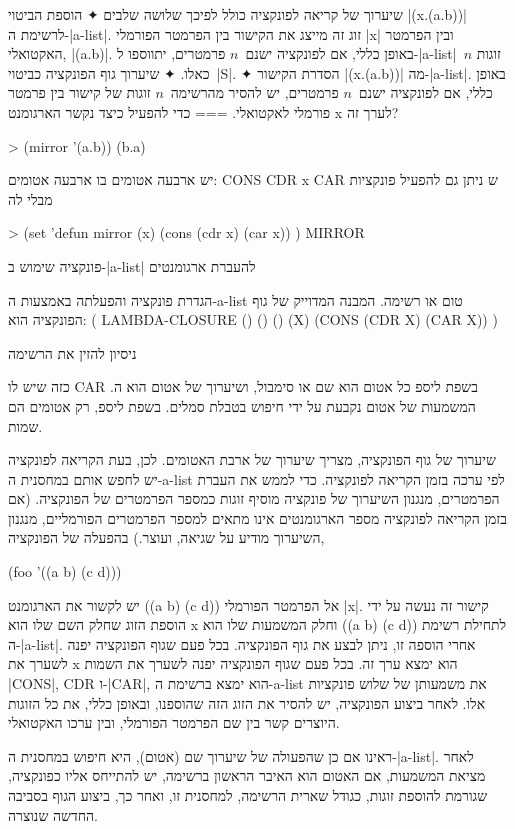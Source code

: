 \documentclass[a4paper,12pt,reqno]{article}
\begin{document}
שיערוך של קריאה לפונקציה כולל לפיכך שלושה שלבים
✦ הוספת הביטוי \E|(x.(a.b))| לרשימת ה-\E|a-list|. זוג זה מייצג את הקישור בין
הפרמטר הפורמלי \E|x| ובין הפרמטר האקטואלי, \E|(a.b)|. באופן כללי, אם לפונקציה
ישנם~$n$ פרמטרים, יתווספו ל-\E|a-list|~$n$ זוגות כאלו.
✦ שיערוך גוף הפונקציה כביטוי~\E|S|.
✦ הסדרת הקישור \E|(x.(a.b))| מה-\E|a-list|. באופן כללי, אם לפונקציה
ישנם~$n$ פרמטרים, יש להסיר מהרשימה~$n$ זוגות של קישור בין פרמטר פורמלי
לאקטואלי.
===
כדי
להפעיל
כיצד נקשר הארגומנט x
לערך זה?
\begin{LISP}
> (mirror '(a.b))
(b.a)
\end{LISP}

יש ארבעה אטומים בו ארבעה אטומים:
CONS
CDR
x
CAR
ש
ניתן גם להפעיל פונקציות מבלי לה
\begin{LISP}
> (set 'defun
  mirror (x)
  (cons (cdr x) (car x))
)
MIRROR
\end{LISP}
פונקציה
שימוש ב-\E|a-list| להעברת ארגומנטים

הגדרת פונקציה והפעלתה באמצעות ה-a-list
טום או רשימה. המבנה המדוייק של גוף הפונקציה הוא:
(
LAMBDA-CLOSURE () () ()
(X)
(CONS (CDR X) (CAR X))
)

ניסיון להזין את הרשימה

כזה שיש לו CּAR בשפת ליספ כל אטום הוא שם או סימבול,
ושיערוך של אטום
הוא ה.
המשמעות של אטום נקבעת על ידי חיפוש בטבלת סמלים. בשפת ליספ, רק אטומים הם שמות.

שיערוך של גוף הפונקציה, מצריך שיערוך של ארבת האטומים. לכן, בעת הקריאה לפונקציה
יש לחפש אותם במחסנית ה-a-list לפי ערכה בזמן הקריאה לפונקציה. כדי לממש את העברת
הפרמטרים, מנגנון השיערוך של פונקציה מוסיף זוגות כמספר הפרמטרים של הפונקציה. (אם
בזמן הקריאה לפונקציה מספר הארגומנטים אינו מתאים למספר הפרמטרים הפורמליים, מנגנון
השיערוך מודיע על שגיאה, ועוצר.) בהפעלה של הפונקציה,
\begin{LISP}
  (foo '((a b) (c d)))
\end{LISP}
יש לקשור את הארגומנט ((a b) (c d)) אל הפרמטר הפורמלי \E|x|. קישור זה נעשה על
ידי הוספת הזוג שחלק השם שלו הוא x וחלק המשמעות שלו הוא ((a b) (c d)) לתחילת
רשימת
ה-\E|a-list|. אחרי הוספה זו, ניתן לבצע את גוף הפונקציה. בכל פעם שגוף הפונקציה יפנה
לשערך את x הוא ימצא ערך זה. בכל פעם שגוף הפונקציה יפנה לשערך את השמות \E|CONS|,
CDR ו-\E|CAR|, הוא ימצא ברשימת ה-a-list את משמעותן של שלוש פונקציות אלו. לאחר
ביצוע
הפונקציה, יש להסיר את הזוג הזה שהוספנו, ובאופן כללי, את כל הזוגות היוצרים קשר
בין שם הפרמטר הפורמלי, ובין ערכו האקטואלי.

ראינו אם כן שהפעולה של שיערוך שם
(אטום), היא חיפוש במחסנית ה-\E|a-list|. לאחר מציאת המשמעות, אם האטום הוא האיבר
הראשון ברשימה, יש להתייחס אליו כפונקציה, שגורמת להוספת זוגות, כגודל שארית
הרשימה, למחסנית זו, ואחר כך, ביצוע הגוף בסביבה החדשה שנוצרה.
\end{document}

